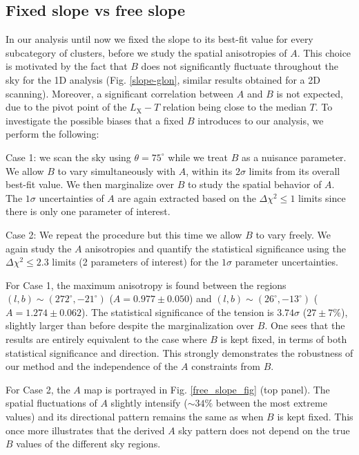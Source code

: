\documentclass{aa}   %
\begin{document}
\subsection{Fixed slope vs free slope}\label{free_slope}

In our analysis until now we fixed the slope to its best-fit value for every subcategory of clusters, before we study the spatial anisotropies of $A$. This choice is motivated by the fact that $B$ does not significantly fluctuate throughout the sky for the 1D analysis (Fig. \ref{slope-glon}, similar results obtained for a 2D scanning). Moreover, a significant correlation between $A$ and $B$ is not expected, due to the pivot point of the $L_{\text{X}}-T$ relation being close to the median $T$. To investigate the possible biases that a fixed $B$ introduces to our analysis, we perform the following:

Case 1: we scan the sky using $\theta=75^{\circ}$ while we treat $B$ as a nuisance parameter. We allow $B$ to vary simultaneously with $A$, within its $2\sigma$ limits from its overall best-fit value. We then marginalize over $B$ to study the spatial behavior of $A$. The $1\sigma$ uncertainties of $A$ are again extracted based on the $\Delta \chi^2\leq 1$ limits since there is only one parameter of interest.

Case 2: We repeat the procedure but this time we allow $B$ to vary freely. We again study the $A$ anisotropies and quantify the statistical significance using the $\Delta \chi^2\leq 2.3$ limits (2 parameters of interest) for the $1\sigma$ parameter uncertainties.



For Case 1, the maximum anisotropy is found between the regions $(l,b)\sim (272^{\circ}, -21^{\circ})$ ($A=0.977\pm 0.050$) and $(l,b)\sim (26^{\circ}, -13^{\circ})$ ($A=1.274\pm 0.062$). The statistical significance of the tension is $3.74\sigma$ ($27\pm 7\%$), slightly larger than before despite the marginalization over $B$. One sees that the results are entirely equivalent to the case where $B$ is kept fixed, in terms of both statistical significance and direction. This strongly demonstrates the robustness of our method and the independence of the $A$ constraints from $B$.

For Case 2, the $A$ map is portrayed in Fig. \ref{free_slope_fig} (top panel). The spatial fluctuations of $A$ slightly intensify ($\sim 34\%$ between the most extreme values) and its directional pattern remains the same as when $B$ is kept fixed. This once more illustrates that the derived $A$ sky pattern does not depend on the true $B$ values of the different sky regions.
\end{document}
